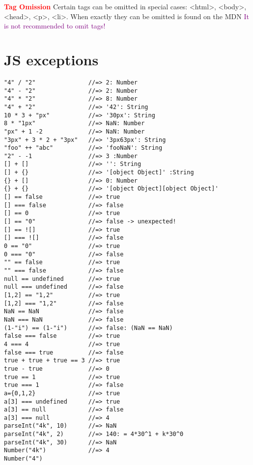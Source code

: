 \documentclass[main.tex,fontsize=6pt,paper=a4,paper=landscape,DIV=calc,]{scrartcl}
\begin{document}
\begin{multicols*}{4}
\textbf{\textcolor{red}{Tag Omission}}\newline 
Certain tags can be omitted in special cases:\newline
<html>, <body>, <head>, <p>, <li>.\newline
When exactly they can be omitted is found on the MDN\newline
\textcolor{purple}{It is not recommended to omit tags!}

\section{JS exceptions}
\vspace{-2mm}
\begin{lstlisting}
"4" / "2"               //=> 2: Number
"4" - "2"               //=> 2: Number
"4" * "2"               //=> 8: Number
"4" + "2"               //=> '42': String
10 * 3 + "px"           //=> '30px': String
8 * "1px"               //=> NaN: Number
"px" + 1 -2             //=> NaN: Number
"3px" + 3 * 2 + "3px"   //=> '3px63px': String
"foo" ++ "abc"          //=> 'fooNaN': String
"2" - -1                //=> 3 :Number
[] + []                 //=> '': String
[] + {}                 //=> '[object Object]' :String
{} + []                 //=> 0: Number
{} + {}                 //=> '[object Object][object Object]'
[] == false             //=> true
[] === false            //=> false
[] == 0                 //=> true
[] == "0"               //=> false -> unexpected!
[] == ![]               //=> true
[] === ![]              //=> false
0 == "0"                //=> true
0 === "0"               //=> false
"" == false             //=> true
"" === false            //=> false
null == undefined       //=> true
null === undefined      //=> false
[1,2] == "1,2"          //=> true
[1,2] === "1,2"         //=> false
NaN == NaN              //=> false
NaN === NaN             //=> false
(1-"i") == (1-"i")      //=> false: (NaN == NaN)
false === false         //=> true
4 === 4                 //=> true
false === true          //=> false
true + true + true == 3 //=> true 
true - true             //=> 0   
true == 1               //=> true
true === 1              //=> false
a={0,1,2}               //=> true
a[3] === undefined      //=> true
a[3] == null            //=> false
a[3] === null           //=> 4   
parseInt("4k", 10)      //=> NaN 
parseInt("4k", 2)       //=> 140: = 4*30^1 + k*30^0
parseInt("4k", 30)      //=> NaN
Number("4k")            //=> 4
Number("4")              
\end{lstlisting}

\end{multicols*}
\end{document}
